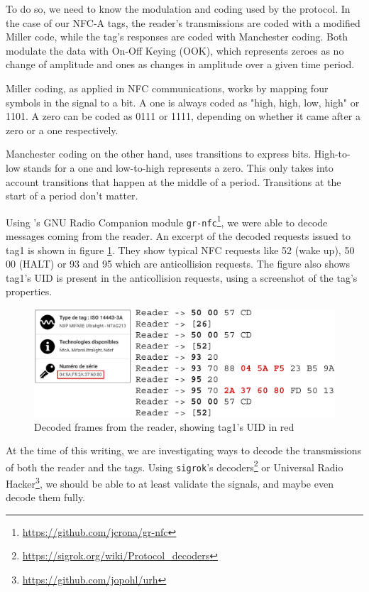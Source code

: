 To do so, we need to know the modulation and coding used by the protocol. In the case of our NFC-A tags, the reader's transmissions are coded with a modified Miller code, while the tag's responses are coded with Manchester coding. Both modulate the data with On-Off Keying (OOK), which represents zeroes as no change of amplitude and ones as changes in amplitude over a given time period. \cite{wiki_off_2020}

Miller coding, as applied in NFC communications, works by mapping four symbols in the signal to a bit. A one is always coded as "high, high, low, high" or 1101. A zero can be coded as 0111 or 1111, depending on whether it came after a zero or a one respectively. \cite{phy_nfc_coding}

Manchester coding on the other hand, uses transitions to express bits. High-to-low stands for a one and low-to-high represents a zero. This only takes into account transitions that happen at the middle of a period. Transitions at the start of a period don't matter. \cite{phy_nfc_coding, wiki_manchester_2019}

Using \textcite{rona_sniffing_2017}'s GNU Radio Companion module \texttt{gr-nfc}\footnote{\url{https://github.com/jcrona/gr-nfc}}, we were able to decode messages coming from the reader. An excerpt of the decoded requests issued to tag1 is shown in figure \ref{fig:decoded}. They show typical NFC requests like 52 (wake up), 50 00 (HALT) or 93 and 95 which are anticollision requests. The figure also shows tag1's UID is present in the anticollision requests, using a screenshot of the tag's properties.

\begin{figure}[htp!]
  \centering
  \includegraphics[scale=0.35]{figures/data_decoded-frames_app.png}
  \caption{Decoded frames from the reader, showing tag1's UID in red}
  \label{fig:decoded}
\end{figure}

At the time of this writing, we are investigating ways to decode the transmissions of both the reader and the tags. Using \texttt{sigrok}'s decoders\footnote{\url{https://sigrok.org/wiki/Protocol_decoders}} or Universal Radio Hacker\footnote{\url{https://github.com/jopohl/urh}}, we should be able to at least validate the signals, and maybe even decode them fully.
